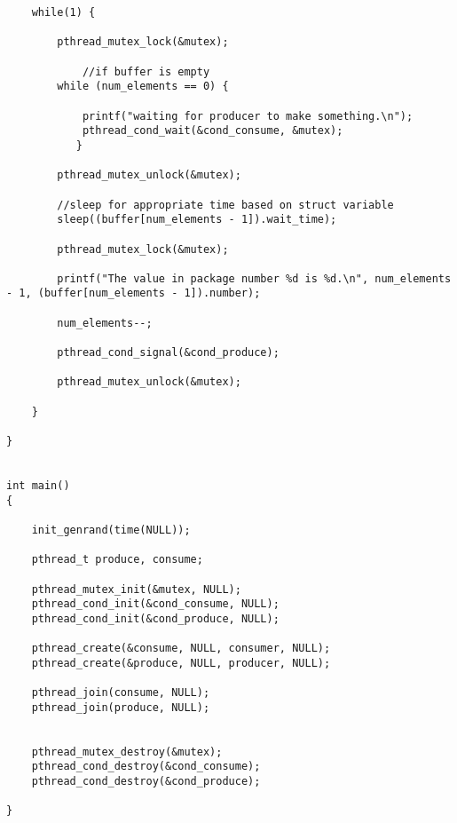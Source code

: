 \documentclass[letterpaper,
10pt, titlepage, draftclsnofoot, onecolumn]{IEEEtran}
\begin{document}
\begin{lstlisting}
	while(1) {

		pthread_mutex_lock(&mutex);

	    	//if buffer is empty
		while (num_elements == 0) {

			printf("waiting for producer to make something.\n");
			pthread_cond_wait(&cond_consume, &mutex);
	       }

		pthread_mutex_unlock(&mutex);

		//sleep for appropriate time based on struct variable
		sleep((buffer[num_elements - 1]).wait_time);

		pthread_mutex_lock(&mutex);

		printf("The value in package number %d is %d.\n", num_elements - 1, (buffer[num_elements - 1]).number);

		num_elements--;

		pthread_cond_signal(&cond_produce);

		pthread_mutex_unlock(&mutex);

	}

}


int main()
{

	init_genrand(time(NULL));

	pthread_t produce, consume;

	pthread_mutex_init(&mutex, NULL);
	pthread_cond_init(&cond_consume, NULL);
	pthread_cond_init(&cond_produce, NULL);

	pthread_create(&consume, NULL, consumer, NULL);
	pthread_create(&produce, NULL, producer, NULL);

	pthread_join(consume, NULL);
	pthread_join(produce, NULL);


	pthread_mutex_destroy(&mutex);
	pthread_cond_destroy(&cond_consume);
	pthread_cond_destroy(&cond_produce);

}

\end{lstlisting}
\end{document}
